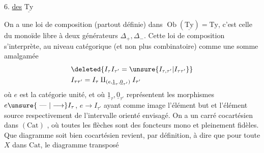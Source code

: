 

6. \uline{ des} $\underline{\mathrm{Ty}}$

On a une loi de composition (partout définie) dans $\operatorname{Ob}(\underline{\mathrm{Ty}})=\mathrm{Ty}$, c'est celle du monoïde libre à deux générateurs $\Delta_+,\Delta_-$. Cette loi de composition s'interprète, au niveau  catégorique (et non plus  combinatoire) comme une somme amalgamée
\[
\begin{aligned}
&\deleted{I_\tau I_{\tau'}=\unsure{I_{\tau,\tau'}|I_{\tau\tau'}}}\\
&I_{\tau\tau'}=I_\tau\amalg_{(e,\underline{1}_\tau,\underline{0}_{\tau'})}I_{\tau'}
\end{aligned}
\]
où $e$ est la catégorie unité, et où $\underline{1}_\tau,\underline{0}_{\tau'}$ représentent  les morphismes $e\unsure{\text{ --- }|\longrightarrow}I_\tau$, $e\longrightarrow I_{\tau'}$ ayant comme image l'élément but et l'élément source respectivement de l'intervalle orienté envisagé. On a  un carré cocartésien dans $(\mathrm{Cat})$
,
où toutes les flèches sont des foncteurs mono et pleinement fidèles. Que  diagramme  soit bien cocartésien  revient, par définition, à dire que pour  toute $X$ dans $\mathrm{Cat}$, le diagramme transposé

